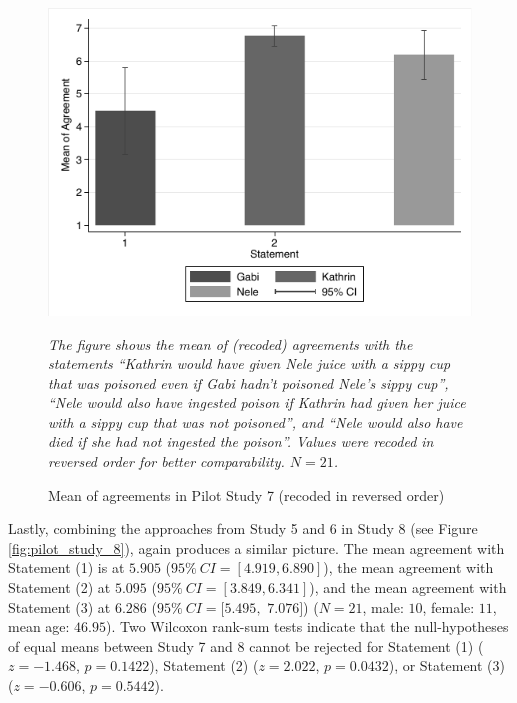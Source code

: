 \documentclass[egregdoesnotlikesansseriftitles,12pt]{scrartcl}
\begin{document}
\begin{figure}[H]
   \centering
   \includegraphics[scale=0.8]{figures/pilot_study_7.pdf}
   \begin{minipage}{0.9\linewidth}
   \footnotesize
   \emph{The figure shows the mean of (recoded) agreements with the statements ``Kathrin would have given Nele juice with a sippy cup that was poisoned even if Gabi hadn't poisoned Nele's sippy cup'', ``Nele would also have ingested poison if Kathrin had given her juice with a sippy cup that was not poisoned'', and ``Nele would also have died if she had not ingested the poison''. Values were recoded in reversed order for better comparability. $N=21$.}
   \end{minipage}
   \caption{Mean of agreements in Pilot Study 7 (recoded in reversed order)}
   \label{fig:pilot_study_7}
\end{figure}

\noindent Lastly, combining the approaches from Study 5 and 6 in Study 8 (see Figure \ref{fig:pilot_study_8}), again produces a similar picture. The mean agreement with Statement (1) is at $5.905$ ($95\%~CI=[4.919,6.890]$), the mean agreement with Statement (2) at $5.095$ ($95\%~CI=[3.849,6.341]$), and the mean agreement with Statement (3) at $6.286$ ($95\%~CI=[5.495,$ $7.076]$) ($N=21$, male: $10$, female: $11$, mean age: $46.95$). Two Wilcoxon rank-sum tests indicate that the null-hypotheses of equal means between Study 7 and 8 cannot be rejected for Statement (1) ($z=-1.468$, $p=0.1422$), Statement (2) ($z=2.022$, $p=0.0432$), or Statement (3) ($z=-0.606$, $p=0.5442$).
\end{document}
